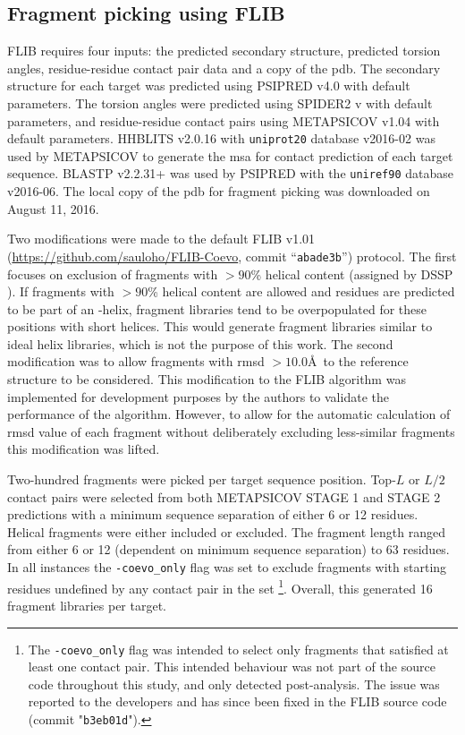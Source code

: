 \subsection{Fragment picking using FLIB}
FLIB \cite{De_Oliveira2015-kb} requires four inputs: the predicted secondary structure, predicted torsion angles, residue-residue contact pair data and a copy of the \gls{pdb}. The secondary structure for each target was predicted using PSIPRED v4.0 \cite{Jones1999-ed} with default parameters. The torsion angles were predicted using SPIDER2 v\cite{Heffernan2015-bt} with default parameters, and residue-residue contact pairs using METAPSICOV v1.04 \cite{Jones2015-vq} with default parameters. HHBLITS v2.0.16 \cite{Remmert2011-kt} with \texttt{uniprot20} database v2016-02 was used by METAPSICOV to generate the \gls{msa} for contact prediction of each target sequence. BLASTP v2.2.31+ \cite{Altschul1990-og,Camacho2009-th} was used by PSIPRED with the \texttt{uniref90} database v2016-06. The local copy of the \gls{pdb} for fragment picking was downloaded on August 11, 2016.

Two modifications were made to the default FLIB v1.01 (\url{https://github.com/sauloho/FLIB-Coevo}, commit “\texttt{abade3b}”) protocol. The first focuses on exclusion of fragments with $>90$\% helical content (assigned by DSSP \cite{Frishman1995-si}). If fragments with $>90$\% helical content are allowed and residues are predicted to be part of an \textalpha-helix, fragment libraries tend to be overpopulated for these positions with short helices. This would generate fragment libraries similar to ideal helix libraries, which is not the purpose of this work. The second modification was to allow fragments with \gls{rmsd} $>10.0$\AA\ to the reference structure to be considered. This modification to the FLIB algorithm was implemented for development purposes by the authors to validate the performance of the algorithm. However, to allow for the automatic calculation of \gls{rmsd} value of each fragment without deliberately excluding less-similar fragments this modification was lifted.

Two-hundred fragments were picked per target sequence position. Top-$L$ or $L/2$ contact pairs were selected from both METAPSICOV STAGE 1 and STAGE 2 predictions with a minimum sequence separation of either 6 or 12 residues. Helical fragments were either included or excluded. The fragment length ranged from either 6 or 12 (dependent on minimum sequence separation) to 63 residues. In all instances the \texttt{-coevo\_only} flag was set to exclude fragments with starting residues undefined by any contact pair in the set \footnote{The \texttt{-coevo\_only} flag was intended to select only fragments that satisfied at least one contact pair. This intended behaviour was not part of the source code throughout this study, and only detected post-analysis. The issue was reported to the developers and has since been fixed in the FLIB source code (commit "\texttt{b3eb01d}").}. Overall, this generated 16 fragment libraries per target.

